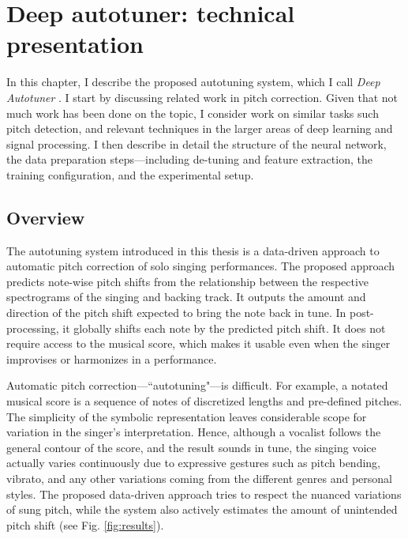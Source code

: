 \chapter{Deep autotuner: technical presentation}
\label{chap:thesis-autotuner}
In this chapter, I describe the proposed autotuning system, which I call \textit{Deep Autotuner} \cite{wager2020deep}. I start by discussing related work in pitch correction. Given that not much work has been done on the topic, I consider work on similar tasks such pitch detection, and relevant techniques in the larger areas of deep learning and signal processing. I then describe in detail the structure of the neural network, the data preparation steps---including de-tuning and feature extraction, the training configuration, and the experimental setup. 


\section{Overview}
The autotuning system introduced in this thesis is a data-driven approach to automatic pitch correction of solo singing performances. The proposed approach predicts note-wise pitch shifts from the relationship between the respective spectrograms of the singing and backing track. It outputs the amount and direction of the pitch shift expected to bring the note back in tune. In post-processing, it globally shifts each note by the predicted pitch shift. It does not require access to the musical score, which makes it usable even when the singer improvises or harmonizes in a performance.

Automatic pitch correction---``autotuning"---is difficult. For example, a notated musical score is a sequence of notes of discretized lengths and pre-defined pitches. The simplicity of the symbolic representation leaves considerable scope for variation in the singer's interpretation. Hence, although a vocalist follows the general contour of the score, and the result sounds in tune, the singing voice actually varies continuously due to expressive gestures such as pitch bending, vibrato, and any other variations coming from the different genres and personal styles. The proposed data-driven approach tries to respect the nuanced variations of sung pitch, while the system also actively estimates the amount of unintended pitch shift (see Fig. \ref{fig:results}).

